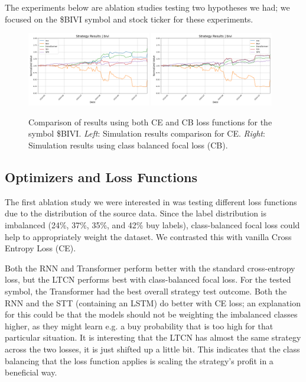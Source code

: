 \documentclass[10pt,twocolumn,letterpaper]{article}
\begin{document}
The experiments below are ablation studies testing two hypotheses we had; we focused on the \$BIVI symbol and stock ticker for these experiments.


\begin{figure}[ht!]
    \centering
    \includegraphics[width=0.48\textwidth]{../figures/simulation_results_all_models_bivi_config_loss_ce.yml.png}
    \includegraphics[width=0.48\textwidth]{../figures/simulation_results_all_models_bivi_config_loss_cbfocal.yml.png} 
    \caption{Comparison of results using both CE and CB loss functions for the symbol \$BIVI. \emph{Left}: Simulation results comparison for CE. \emph{Right}: Simulation results using class balanced focal loss (CB).}
    \label{fig:ceVsCbLoss}
\end{figure}

\subsection{Optimizers and Loss Functions}

The first ablation study we were interested in was testing different loss functions due to the distribution of the source data. Since the label distribution is imbalanced (24\%, 37\%, 35\%, and 42\% buy labels), class-balanced focal loss could help to appropriately weight the dataset\cite{cb_focal}. We contrasted this with vanilla Cross Entropy Loss (CE).

Both the RNN and Transformer perform better with the standard cross-entropy loss, but the LTCN performs best with class-balanced focal loss. For the tested symbol, the Transformer had the best overall strategy test outcome. Both the RNN and the STT (containing an LSTM) do better with CE loss; an explanation for this could be that the models should not be weighting the imbalanced classes higher, as they might learn e.g. a buy probability that is too high for that particular situation. It is interesting that the LTCN has almost the same strategy across the two losses, it is just shifted up a little bit. This indicates that the class balancing that the loss function applies is scaling the strategy's profit in a beneficial way.
\end{document}
